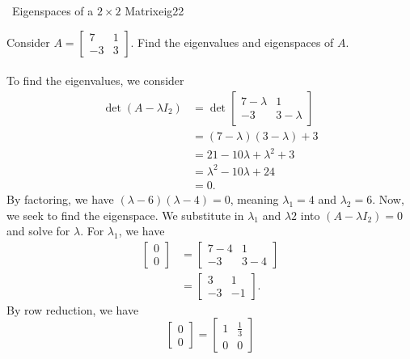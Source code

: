         \begin{example}{\Difficulty\,\Difficulty\,\,Eigenspaces of a \(2\times 2\) Matrix}{eig22}
            
            Consider \(A=\begin{bmatrix} 7 & 1 \\ -3 & 3 \end{bmatrix}\). Find the eigenvalues and eigenspaces of \(A\).
            \\
            \\
            To find the eigenvalues, we consider
            \begin{align*}
                \det(A-\lambda I_2)&=\det \begin{bmatrix} 7-\lambda & 1 \\ -3 & 3-\lambda \end{bmatrix} \\
                &=(7-\lambda)(3-\lambda)+3 \\
                &=21-10\lambda+\lambda^2+3 \\
                &=\lambda^2-10\lambda+24 \\
                &=0.
            \end{align*}
            By factoring, we have \((\lambda-6)(\lambda-4)=0\), meaning \(\lambda_1=4\) and \(\lambda_2=6\). Now, we seek to find the eigenspace. We substitute in \(\lambda_1\) and \(\lambda 2\) into \((A-\lambda I_2)=0\) and solve for \(\lambda\). For \(\lambda_1\), we have
            \begin{align*}
                \begin{bmatrix} 0 \\ 0 \end{bmatrix}&=\begin{bmatrix} 7-4 & 1 \\ -3 & 3-4 \end{bmatrix} \\
                &=\begin{bmatrix} 3 & 1 \\ -3 & -1 \end{bmatrix}.
            \end{align*}
            By row reduction, we have
            \begin{equation*}
                \begin{bmatrix} 0 \\ 0 \end{bmatrix}=\begin{bmatrix} 1 & \frac{1}{3} \\ 0 & 0 \end{bmatrix}

\end{equation*}
\end{example}
